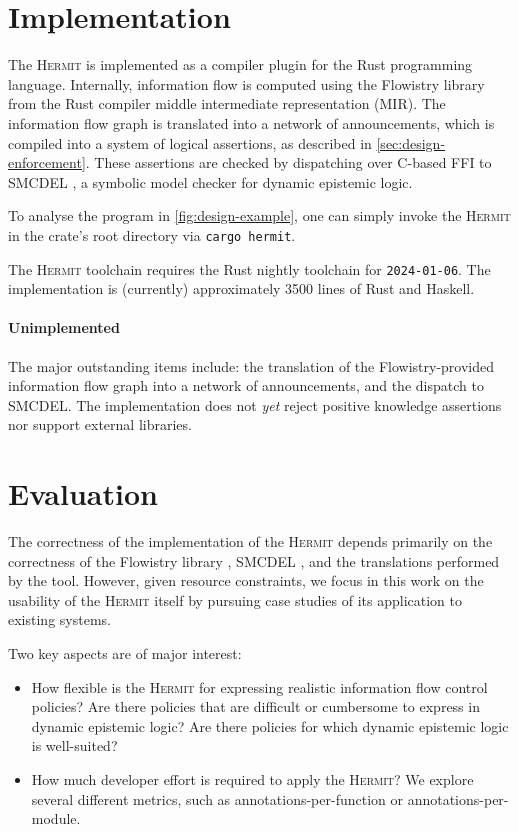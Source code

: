 \documentclass[letterpaper,twocolumn,10pt]{article}
\newcommand{\Hermit}{\textsc{Hermit}\xspace}
\begin{document}
\section{Implementation}
\label{sec:implementation}

The \Hermit is implemented as a compiler plugin for the Rust programming language.
Internally, information flow is computed using the Flowistry library \cite{crichton_2022a} from the Rust compiler middle intermediate representation (MIR).
The information flow graph is translated into a network of announcements, which is compiled into a system of logical assertions, as described in \cref{sec:design-enforcement}.
These assertions are checked by dispatching over C-based FFI to SMCDEL \cite{gattinger_2018a}, a symbolic model checker for dynamic epistemic logic.

To analyse the program in \cref{fig:design-example}, one can simply invoke the \Hermit{} in the crate's root directory via \lstinline{cargo hermit}.

The \Hermit{} toolchain requires the Rust nightly toolchain for \lstinline{2024-01-06}.
The implementation is (currently) approximately 3500 lines of Rust and Haskell.

\paragraph{Unimplemented}
The major outstanding items include: the translation of the Flowistry-provided information flow graph into a network of announcements, and the dispatch to SMCDEL.
The implementation does not \emph{yet} reject positive knowledge assertions nor support external libraries.

\section{Evaluation}
\label{sec:evaluation}

The correctness of the implementation of the \Hermit depends primarily on the correctness of the Flowistry library \cite{crichton_2022a}, SMCDEL \cite{gattinger_2018a}, and the translations performed by the tool.
However, given resource constraints, we focus in this work on the usability of the \Hermit itself by pursuing case studies of its application to existing systems.

Two key aspects are of major interest:

\begin{itemize}
  \item How flexible is the \Hermit for expressing realistic information flow control policies? Are
    there policies that are difficult or cumbersome to express in dynamic epistemic logic? Are there
    policies for which dynamic epistemic logic is well-suited?

  \item How much developer effort is required to apply the \Hermit? We explore several different
    metrics, such as annotations-per-function or annotations-per-module.
\end{itemize}
\end{document}
